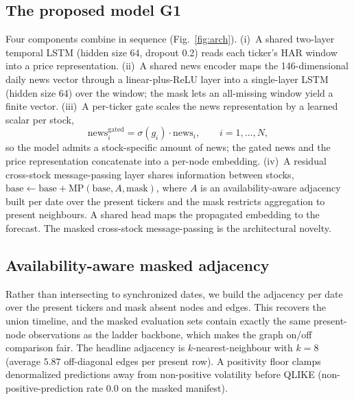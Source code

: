 \documentclass[runningheads]{llncs}
\begin{document}
\subsection{The proposed model G1}
Four components combine in sequence (Fig.~\ref{fig:arch}). (i)~A shared two-layer temporal LSTM (hidden
size 64, dropout 0.2) reads each ticker's HAR window into a price representation. (ii)~A shared news
encoder maps the 146-dimensional daily news vector through a linear-plus-ReLU layer into a single-layer
LSTM (hidden size 64) over the window; the mask lets an all-missing window yield a finite vector.
(iii)~A per-ticker gate scales the news representation by a learned scalar per stock,
\begin{equation}
\text{news}^{\text{gated}}_{i} = \sigma(g_i)\cdot \text{news}_{i}, \qquad i=1,\dots,N,
\label{eq:gate}
\end{equation}
so the model admits a stock-specific amount of news; the gated news and the price representation
concatenate into a per-node embedding. (iv)~A residual cross-stock message-passing layer shares
information between stocks, $\text{base}\leftarrow\text{base}+\text{MP}(\text{base},A,\text{mask})$, where
$A$ is an availability-aware adjacency built per date over the present tickers and the mask restricts
aggregation to present neighbours. A shared head maps the propagated embedding to the forecast. The
masked cross-stock message-passing is the architectural novelty.

\subsection{Availability-aware masked adjacency}
Rather than intersecting to synchronized dates, we build the adjacency per date over the present tickers
and mask absent nodes and edges. This recovers the union timeline, and the masked evaluation sets contain
exactly the same present-node observations as the ladder backbone, which makes the graph on/off comparison
fair. The headline adjacency is $k$-nearest-neighbour with $k=8$ (average $5.87$ off-diagonal edges per
present row). A positivity floor clamps denormalized predictions away from non-positive volatility before
QLIKE (non-positive-prediction rate $0.0$ on the masked manifest).
\end{document}

